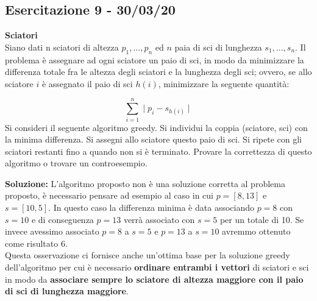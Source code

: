 \documentclass[../cheatSheetAlgoritmi.tex]{subfiles}
\begin{document}
\subsection{Esercitazione 9 - 30/03/20}
\textbf{Sciatori}\\
Siano dati n sciatori di altezza $p_{1}, ..., p_{n}$ ed $n$ paia di sci di lunghezza $s_{1}, ..., s_{n}$. Il problema è assegnare ad ogni sciatore un paio di sci, in modo da minimizzare la differenza totale fra le altezza degli sciatori e la lunghezza degli sci; ovvero, se allo sciatore $i$ è assegnato il paio di sci $h(i)$, minimizzare la seguente quantità:


\begin{equation}
	\sum_{i = 1}^{n}\mid{p_{i} - s_{h(i)}}\mid
\end{equation}
Si consideri il seguente algoritmo greedy. Si individui la coppia (sciatore, sci) con la minima differenza. Si assegni allo sciatore questo paio di sci. Si ripete con gli sciatori restanti fino a quando non si è terminato. Provare la correttezza di questo algoritmo o trovare un controesempio.

\bigskip
\textbf{Soluzione:} L'algoritmo proposto non è una soluzione corretta al problema proposto, è necessario pensare ad esempio al caso in cui $p = [8, 13]$ e $s = [10, 5]$. In questo caso la differenza minima è data associando $p = 8$ con $s = 10$ e di conseguenza $p = 13$ verrà associato con $s = 5$ per un totale di 10. Se invece avessimo associato $p = 8$ a $s = 5$ e $p = 13$ a $s = 10$ avremmo ottenuto come risultato 6.\\
Questa osservazione ci fornisce anche un'ottima base per la soluzione greedy dell'algoritmo per cui è necessario \textbf{ordinare entrambi i vettori} di sciatori e sci in modo da \textbf{associare sempre lo sciatore di altezza maggiore con il paio di sci di lunghezza maggiore}.
\end{document}
